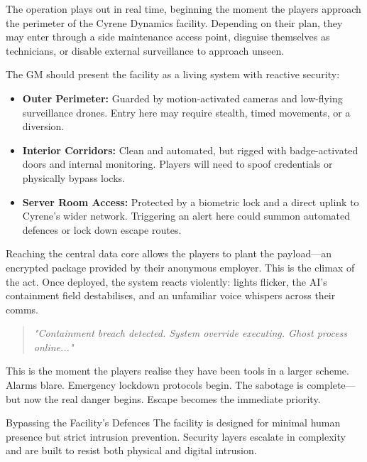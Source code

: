 \documentclass[nodeprecatedcode,bg=print]{dndbook}
\begin{document}
\begin{multicols}{2}
The operation plays out in real time, beginning the moment the players approach the perimeter of the Cyrene Dynamics facility. Depending on their plan, they may enter through a side maintenance access point, disguise themselves as technicians, or disable external surveillance to approach unseen.

The GM should present the facility as a living system with reactive security:

\begin{itemize}
    \item \textbf{Outer Perimeter:} Guarded by motion-activated cameras and low-flying surveillance drones. Entry here may require stealth, timed movements, or a diversion.
    \item \textbf{Interior Corridors:} Clean and automated, but rigged with badge-activated doors and internal monitoring. Players will need to spoof credentials or physically bypass locks.
    \item \textbf{Server Room Access:} Protected by a biometric lock and a direct uplink to Cyrene’s wider network. Triggering an alert here could summon automated defences or lock down escape routes.
\end{itemize}

Reaching the central data core allows the players to plant the payload—an encrypted package provided by their anonymous employer. This is the climax of the act. Once deployed, the system reacts violently: lights flicker, the AI's containment field destabilises, and an unfamiliar voice whispers across their comms.

\vspace{0.5\baselineskip}
\begin{quote}
\textit{"Containment breach detected. System override executing. Ghost process online..."}  
\end{quote}
\vspace{0.5\baselineskip}

This is the moment the players realise they have been tools in a larger scheme. Alarms blare. Emergency lockdown protocols begin. The sabotage is complete—but now the real danger begins. Escape becomes the immediate priority.

\begin{CommentBox}{Bypassing the Facility’s Defences}
    The facility is designed for minimal human presence but strict intrusion prevention. Security layers escalate in complexity and are built to resist both physical and digital intrusion.
    

\end{CommentBox}
\end{multicols}
\end{document}
